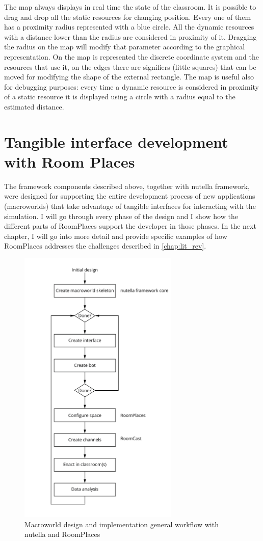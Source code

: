 The map always displays in real time the state of the classroom. It is possible to drag and drop all the static resources for changing position. Every one of them has a proximity radius represented with a blue circle. All the dynamic resources with a distance lower than the radius are considered in proximity of it. Dragging the radius on the map will modify that parameter according to the graphical representation. On the map is represented the discrete coordinate system and the resources that use it, on the edges there are signifiers (little squares) that can be moved for modifying the shape of the external rectangle. The map is useful also for debugging purposes: every time a dynamic resource is considered in proximity of a static resource it is displayed using a circle with a radius equal to the estimated distance. 

\section{Tangible interface development with Room Places}
The framework components described above, together with nutella framework, were designed for supporting the entire development process of new applications (macroworlds) that take advantage of tangible interfaces for interacting with the simulation. I will go through every phase of the design and I show how the different parts of RoomPlaces support the developer in those phases. In the next chapter, I will go into more detail and provide specific examples of how RoomPlaces addresses the challenges described in \autoref{chap:lit_rev}.

\begin{figure}
\centering
\includegraphics[width=3in]{images/nutella_workflow.png}
\caption{Macroworld design and implementation general workflow with nutella and RoomPlaces}
\label{fig:nutella_workflow}
\end{figure}

